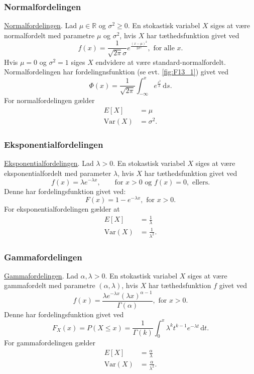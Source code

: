 \subsubsection{Normalfordelingen}
\underline{\hyperref[afs:fornor]{Normalfordelingen}}. Lad $\mu \in \mathbb{R}$ og $\sigma^2 \geq 0$. En stokastisk variabel $X$ siges at være normalfordelt med parametre $\mu$ og $\sigma^2$, hvis $X$ har tæthedsfunktion givet ved
\[ 
f(x) = \frac{1}{\sqrt{2\pi}\sigma}e^{\frac{(x-\mu)^2}{2\sigma^2}}, \text{ for alle } x
.\]
Hvis $\mu = 0$ og $\sigma^2 = 1$ siges $X$ endvidere at være standard-normalfordelt. Normalfordelingen har fordelingnsfunktion (se evt. \autoref{fig:F13_1}) givet ved
\[ 
\Phi(x) = \frac{1}{\sqrt{2\pi}} \int_{-\infty}^{x} e^{\frac{s^2}{2}} \, \mathrm{d}s
.\]
For normalfordelingen gælder
\begin{align*}
  E[X] &= \mu \\
  \mathrm{Var}(X) &= \sigma^2
.\end{align*}


\subsubsection{Eksponentialfordelingen}
\underline{\hyperref[afs:foreks]{Eksponentialfordelingen}}. Lad $\lambda > 0$. En stokastisk variabel $X$ siges at være eksponentialfordelt med parameter $\lambda$, hvis $X$ har tæthedsfunktion givet ved
\[ 
  f(x) = \lambda e^{-\lambda x}, \qquad \text{for } x > 0 \text{ og } f(x) = 0, \text{ ellers}
.\]
Denne har fordelingsfunktion givet ved:
\[ 
F(x) = 1 - e^{-\lambda x}, \text{ for } x > 0
.\]
For eksponentialfordelingen gælder at
\begin{align*}
  E[X] &= \frac{1}{\lambda} \\
  \mathrm{Var}(X) &= \frac{1}{\lambda^2}
.\end{align*}


\subsubsection{Gammafordelingen}
\underline{\hyperref[afs:forgam]{Gammafordelingen}}. Lad $\alpha, \lambda > 0$. En stokastisk variabel $X$ siges at være gammafordelt med parametre $(\alpha, \lambda)$, hvis $X$ har tæthedsfunktion $f$ givet ved
\[ 
f(x) = \frac{\lambda e^{- \lambda x} (\lambda x)^{\alpha - 1}}{\Gamma(\alpha)}, \text{ for } x > 0
.\]
Denne har fordelingsfunktion givet ved
\[
  F_X(x) = P(X \leq x) = \frac{1}{\Gamma(k)} \int_{0}^{x} \lambda^{k} t^{k-1} e^{-\lambda t} \, \mathrm{d}t
.\]
For gammafordelingen gælder
\begin{align*}
  E[X] &= \frac{\alpha}{\lambda} \\
  \mathrm{Var}(X) &= \frac{\alpha}{\lambda^2}
.\end{align*}
